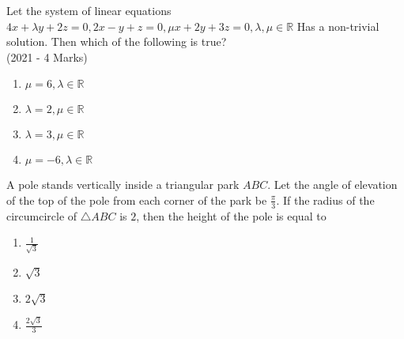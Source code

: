 \iffalse
\title{Assignment 1}
\author{Siddhanth Yellanki - ee24btech11059}
\section{mcq-single}
\fi

    \item{
          	Let the system of linear equations
          	$4x + \lambda y + 2z = 0,
          	2x - y + z = 0,
          	\mu x + 2y + 3z = 0, \lambda, \mu \in \mathbb{R}$
          	Has a non-trivial solution. Then which of the following is true?\\ \text{  }\hfill
                {(2021 - 4 Marks)}
                \begin{multicols}{2}
					\begin{enumerate}
						\item $\mu = 6, \lambda \in \mathbb{R}$
						\item $\lambda = 2, \mu \in \mathbb{R}$
						\item $\lambda = 3, \mu \in \mathbb{R}$
						\item $\mu = -6, \lambda \in \mathbb{R}$
					\end{enumerate}
				\end{multicols}
            }
    \item{
           	A pole stands vertically inside a triangular park $ABC$. Let the angle of elevation of the top of the pole from each corner of the park be $\frac{\pi}{3}$. If the radius of the circumcircle of $\triangle ABC$ is $2$, then the height of the pole is equal to
                \begin{multicols}{4}
                	\begin{enumerate}
                			\item $\frac{1}{\sqrt{3}}$
                			
                			\item $\sqrt{3}$
                			
                			\item $2\sqrt{3}$
                			
                			\item $\frac{2\sqrt{3}}{3}$
                	\end{enumerate}
                \end{multicols}
        }
